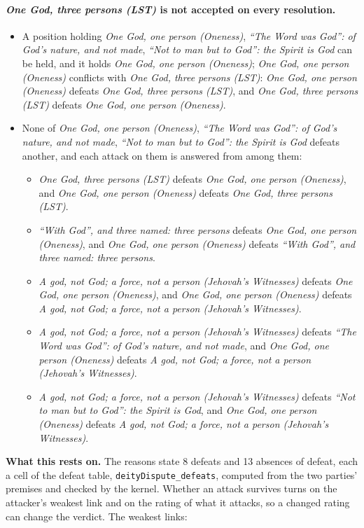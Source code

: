 \documentclass[11pt,paper=\testimonypaper,DIV=13,parskip=false]{scrartcl}
\begin{document}
\paragraph{\emph{One God, three persons (LST)} is not accepted on every resolution.}
\begin{itemize}
\item A position holding \emph{One God, one person (Oneness)}, \emph{“The Word was God”: of God’s nature, and not made}, \emph{“Not to man but to God”: the Spirit is God} can be held, and it holds \emph{One God, one person (Oneness)}; \emph{One God, one person (Oneness)} conflicts with \emph{One God, three persons (LST)}: \emph{One God, one person (Oneness)} defeats \emph{One God, three persons (LST)}, and \emph{One God, three persons (LST)} defeats \emph{One God, one person (Oneness)}.
\item None of \emph{One God, one person (Oneness)}, \emph{“The Word was God”: of God’s nature, and not made}, \emph{“Not to man but to God”: the Spirit is God} defeats another, and each attack on them is answered from among them:
\begin{itemize}
\item \emph{One God, three persons (LST)} defeats \emph{One God, one person (Oneness)}, and \emph{One God, one person (Oneness)} defeats \emph{One God, three persons (LST)}.
\item \emph{“With God”, and three named: three persons} defeats \emph{One God, one person (Oneness)}, and \emph{One God, one person (Oneness)} defeats \emph{“With God”, and three named: three persons}.
\item \emph{A god, not God; a force, not a person (Jehovah’s Witnesses)} defeats \emph{One God, one person (Oneness)}, and \emph{One God, one person (Oneness)} defeats \emph{A god, not God; a force, not a person (Jehovah’s Witnesses)}.
\item \emph{A god, not God; a force, not a person (Jehovah’s Witnesses)} defeats \emph{“The Word was God”: of God’s nature, and not made}, and \emph{One God, one person (Oneness)} defeats \emph{A god, not God; a force, not a person (Jehovah’s Witnesses)}.
\item \emph{A god, not God; a force, not a person (Jehovah’s Witnesses)} defeats \emph{“Not to man but to God”: the Spirit is God}, and \emph{One God, one person (Oneness)} defeats \emph{A god, not God; a force, not a person (Jehovah’s Witnesses)}.
\end{itemize}
\end{itemize}
\par\noindent\textbf{What this rests on.} The reasons state 8 defeats and 13 absences of defeat, each a cell of the defeat table, \texttt{deity\allowbreak{}Dispute\_\allowbreak{}defeats}, computed from the two parties' premises and checked by the kernel. Whether an attack survives turns on the attacker's weakest link and on the rating of what it attacks, so a changed rating can change the verdict. The weakest links:
\end{document}

